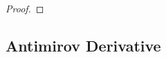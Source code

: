 \documentclass{article}
\newcommand\pdup{\mathop{\mathsf{dup}}}
\renewcommand\star{^{\textstyle *}}
\newcommand\STD{\Delta}
\begin{document}
\begin{proof}
\end{proof}

\subsection*{Antimirov Derivative}
\end{document}
